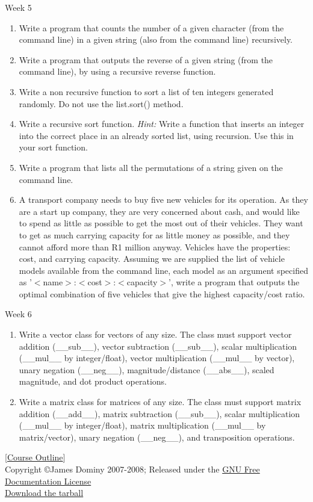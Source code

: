 \documentclass[a4paper,11pt]{article}
\begin{document}
\hypertarget{week5}{Week 5}
\begin{enumerate}
	\item Write a program that counts the number of a given character (from the command line) in a given string (also from the command line) recursively.
	\item Write a program that outputs the reverse of a given string (from the command line), by using a recursive reverse function.
	\item Write a non recursive function to sort a list of ten integers generated randomly. Do not use the list.sort() method.
	\item Write a recursive sort function. \textit{Hint:} Write a function that inserts an integer into the correct place in an already sorted list, using recursion. Use this in your sort function.
	\item Write a program that lists all the permutations of a string given on the command line.
	\item A transport company needs to buy five new vehicles for its operation. As they are a start up company, they are very concerned about cash, and would like to spend as little as possible to get the most out of their vehicles. They    want to get as much carrying capacity for as little money as possible, and they cannot afford more than R1 million anyway. Vehicles have the properties: cost, and carrying capacity. Assuming we are supplied the list of vehicle models available from    the command line, each model as an argument specified as '$<$name$>$:$<$cost$>$:$<$capacity$>$', write a program that outputs the optimal combination of five vehicles that give the highest capacity/cost ratio.
\end{enumerate}

\hypertarget{week6}{Week 6}
\begin{enumerate}
	\item Write a vector class for vectors of any size. The class must support vector addition (\_\_sub\_\_), vector subtraction (\_\_sub\_\_), scalar multiplication (\_\_mul\_\_ by integer/float), vector multiplication (\_\_mul\_\_ by vector), unary    negation (\_\_neg\_\_), magnitude/distance (\_\_abs\_\_), scaled magnitude, and dot product operations.
	\item Write a matrix class for matrices of any size. The class must support matrix addition (\_\_add\_\_), matrix subtraction (\_\_sub\_\_), scalar multiplication (\_\_mul\_\_ by integer/float), matrix multiplication (\_\_mul\_\_ by matrix/vector),    unary negation (\_\_neg\_\_), and transposition operations.
\end{enumerate}    [\href{index.html}{Course Outline}]
\\    [\href{solutions}{Solutions}]      Copyright \copyright James Dominy 2007-2008; Released under the \href{http://www.gnu.org/copyleft/fdl.html}{GNU Free Documentation License}
\\\href{intropython.tar.gz}{Download the tarball}
\end{document}
